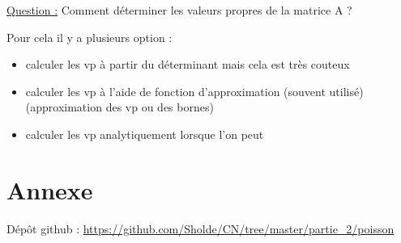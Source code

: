 \documentclass[11pt]{article}
\begin{document}
\underline{Question :} Comment déterminer les valeurs propres de la
matrice A ?\newline

\vspace{5mm}

Pour cela il y a plusieurs option :

\begin{itemize}
\item calculer les vp à partir du déterminant mais cela est très
  couteux
\item calculer les vp à l'aide de fonction d'approximation (souvent
  utilisé) (approximation des vp ou des bornes)
\item calculer les vp analytiquement lorsque l'on peut
\end{itemize}

\section{Annexe}

Dépôt github : \url{https://github.com/Sholde/CN/tree/master/partie_2/poisson}
\end{document}
